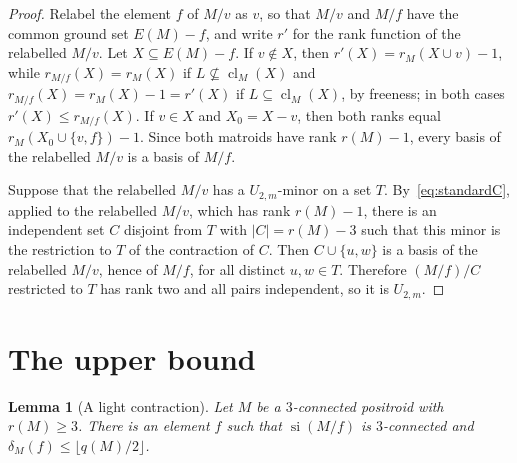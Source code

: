 \documentclass[11pt]{amsart}
\newtheorem{lemma}[theorem]{Lemma}
\theoremstyle{definition}
\theoremstyle{remark}
\numberwithin{equation}{section}
\newcommand{\cl}{\operatorname{cl}}
\newcommand{\si}{\operatorname{si}}
\begin{document}
\begin{proof}
Relabel the element $f$ of $M/v$ as $v$, so that $M/v$ and $M/f$ have the common ground set $E(M)-f$, and write $r'$ for the rank function of the relabelled $M/v$. Let $X\subseteq E(M)-f$. If $v\notin X$, then $r'(X)=r_M(X\cup v)-1$, while $r_{M/f}(X)=r_M(X)$ if $L\not\subseteq\cl_M(X)$ and $r_{M/f}(X)=r_M(X)-1=r'(X)$ if $L\subseteq\cl_M(X)$, by freeness; in both cases $r'(X)\le r_{M/f}(X)$. If $v\in X$ and $X_0=X-v$, then both ranks equal $r_M(X_0\cup\{v,f\})-1$. Since both matroids have rank $r(M)-1$, every basis of the relabelled $M/v$ is a basis of $M/f$.

Suppose that the relabelled $M/v$ has a $U_{2,m}$-minor on a set $T$. By~\eqref{eq:standardC}, applied to the relabelled $M/v$, which has rank $r(M)-1$, there is an independent set $C$ disjoint from $T$ with $|C|=r(M)-3$ such that this minor is the restriction to $T$ of the contraction of $C$. Then $C\cup\{u,w\}$ is a basis of the relabelled $M/v$, hence of $M/f$, for all distinct $u,w\in T$. Therefore $(M/f)/C$ restricted to $T$ has rank two and all pairs independent, so it is $U_{2,m}$.
\end{proof}

\section{The upper bound}\label{sec:bound}

\begin{lemma}[A light contraction]\label{lem:light}
Let $M$ be a $3$-connected positroid with $r(M)\ge3$. There is an element $f$ such that $\si(M/f)$ is $3$-connected and $\delta_M(f)\le\lfloor q(M)/2\rfloor$.
\end{lemma}
\end{document}
